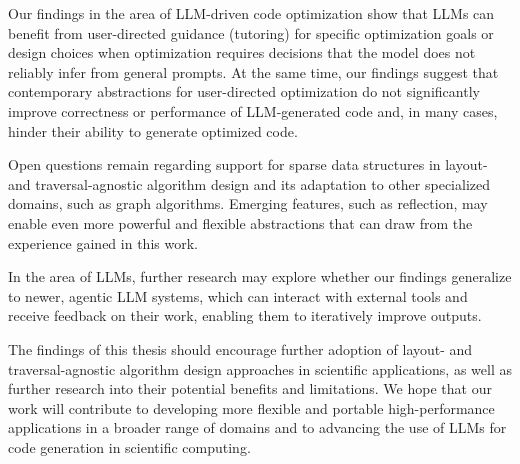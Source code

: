 Our findings in the area of LLM-driven code optimization show that LLMs can benefit from user-directed guidance (tutoring) for specific optimization goals or design choices when optimization requires decisions that the model does not reliably infer from general prompts. At the same time, our findings suggest that contemporary abstractions for user-directed optimization do not significantly improve correctness or performance of LLM-generated code and, in many cases, hinder their ability to generate optimized code.

Open questions remain regarding support for sparse data structures in layout- and traversal-agnostic algorithm design and its adaptation to other specialized domains, such as graph algorithms. Emerging \cpp features, such as reflection, may enable even more powerful and flexible abstractions that can draw from the experience gained in this work.

In the area of LLMs, further research may explore whether our findings generalize to newer, agentic LLM systems, which can interact with external tools and receive feedback on their work, enabling them to iteratively improve outputs.

The findings of this thesis should encourage further adoption of layout- and traversal-agnostic algorithm design approaches in scientific applications, as well as further research into their potential benefits and limitations. We hope that our work will contribute to developing more flexible and portable high-performance applications in a broader range of domains and to advancing the use of LLMs for code generation in scientific computing.
